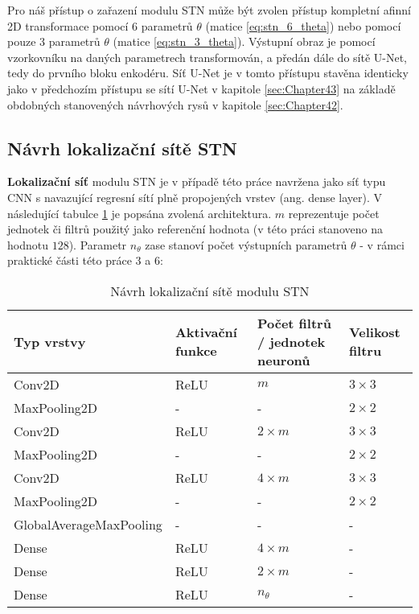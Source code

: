 Pro náš přístup o zařazení modulu STN může být zvolen přístup kompletní afinní 2D transformace pomocí 6 parametrů $\theta$ (matice \ref{eq:stn_6_theta}) nebo pomocí pouze 3 parametrů $\theta$ (matice \ref{eq:stn_3_theta}). Výstupní obraz je pomocí vzorkovníku na daných parametrech transformován, a předán dále do sítě U-Net, tedy do prvního bloku enkodéru. Síť U-Net je v tomto přístupu stavěna identicky jako v předchozím přístupu se sítí U-Net v kapitole \ref{sec:Chapter43} na základě obdobných stanovených návrhových rysů v kapitole \ref{sec:Chapter42}.

\subsection{Návrh lokalizační sítě STN}

\textbf{Lokalizační síť} modulu STN je v případě této práce navržena jako síť typu CNN s navazující regresní sítí plně propojených vrstev (ang. dense layer). V následující tabulce \ref{fig:stn_loc_net} je popsána zvolená architektura. $m$ reprezentuje počet jednotek či filtrů použitý jako referenční hodnota (v této práci stanoveno na hodnotu $128$). Parametr $n_{\theta}$ zase stanoví počet výstupních parametrů $\theta$ - v rámci praktické části této práce $3$ a $6$:

\begin{table}[H]
\centering
\begin{tabular}{@{}llll@{}}
\toprule
Typ vrstvy & Aktivační funkce & Počet filtrů / jednotek neuronů & Velikost filtru \\ \midrule
Conv2D & ReLU & $m$ & $3 \times 3$ \\
MaxPooling2D & - & - & $2 \times 2$ \\
Conv2D & ReLU & $2\times m$ & $3 \times 3$ \\
MaxPooling2D & - & - & $2 \times 2$ \\
Conv2D & ReLU & $4\times m$ & $3 \times 3$ \\
MaxPooling2D & - & - & $2 \times 2$ \\
GlobalAverageMaxPooling & - & - & - \\
\bottomrule
Dense & ReLU & $4\times m$ & - \\
Dense & ReLU & $2\times m$ & - \\
Dense & ReLU & $n_{\theta}$ & - \\
\bottomrule
\end{tabular}
\caption[Návrh lokalizační sítě modulu STN] { Návrh lokalizační sítě modulu STN }
\label{fig:stn_loc_net}
\end{table}

